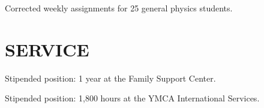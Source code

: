 \documentclass[margin]{res}
\begin{document}
\begin{resume}
    \begin{details}
        \item{Corrected weekly assignments for 25 general physics students.}
     \end{details} 

\section{SERVICE}

    \begin{details}
        \item{Stipended position: 1 year at the Family Support Center.}
    \end{details}

    \begin{details}
        \item{Stipended position: 1,800 hours at the YMCA International Services.}
    \end{details}



\end{resume}
\end{document}
